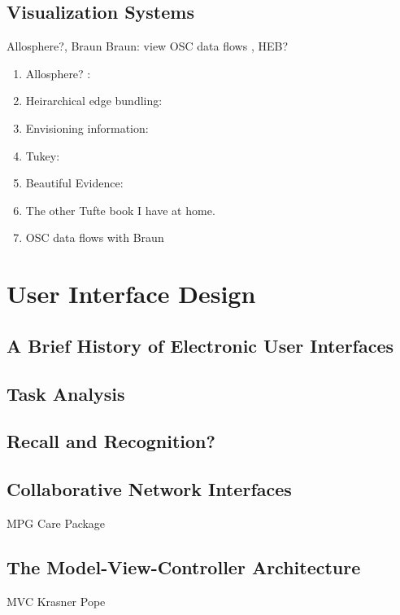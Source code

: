 \subsection{Visualization Systems}
	Allosphere?, Braun Braun: view OSC data flows , HEB?
\begin{enumerate}
	\item Allosphere? :
	\item Heirarchical edge bundling: 
	\item Envisioning information: 
	\item Tukey: 
	\item Beautiful Evidence: 
	\item The other Tufte book I have at home.
	\item OSC data flows with Braun 
\end{enumerate}

\section{User Interface Design}

\subsection{A Brief History of Electronic User Interfaces}
\subsection{Task Analysis}
\subsection{Recall and Recognition?}
\subsection{Collaborative Network Interfaces}
	MPG Care Package 
\subsection{The Model-View-Controller Architecture}
	MVC Krasner Pope 
